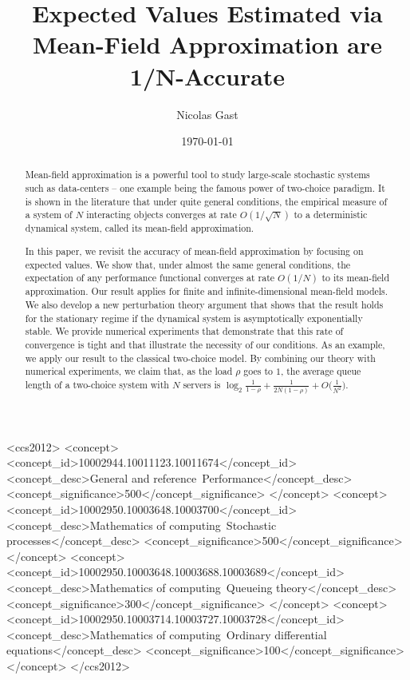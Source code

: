 \documentclass[acmlarge]{acmart}
\title{Expected Values Estimated via Mean-Field Approximation are
  1/N-Accurate}
\author{Nicolas Gast}
\affiliation{%
  \institution{Inria}%
  \streetaddress{Univ. Grenoble Alpes, CNRS, LIG}%
  \city{ Grenoble} %
  \state{France} %
  \postcode{F-38000}%
}%
\date{\today}
\begin{document}
\begin{abstract}
  Mean-field approximation is a powerful tool to study large-scale
  stochastic systems such as data-centers -- one example being the
  famous power of two-choice paradigm.  It is shown in the literature
  that under quite general conditions, the empirical measure of a
  system of $N$ interacting objects converges at rate $O(1/\sqrt{N})$
  to a deterministic dynamical system, called its mean-field
  approximation.

  In this paper, we revisit the accuracy of mean-field approximation
  by focusing on expected values.  We show that, under almost the same
  general conditions, the expectation of any performance functional
  converges at rate $O(1/N)$ to its mean-field approximation.  Our
  result applies for finite and infinite-dimensional mean-field
  models. We also develop a new perturbation theory argument that
  shows that the result holds for the stationary regime if the
  dynamical system is asymptotically exponentially stable.  We provide
  numerical experiments that demonstrate that this rate of convergence
  is tight and that illustrate the necessity of our conditions.  As an
  example, we apply our result to the classical two-choice model. By
  combining our theory with numerical experiments, we claim that, as
  the load $\rho$ goes to $1$, the average queue length of a
  two-choice system with $N$ servers is
  $\log_2\frac1{1-\rho} + \frac1{2N(1-\rho)}
  +O\big(\frac1{N^2}\big)$.
\end{abstract}

\begin{CCSXML}
<ccs2012>
<concept>
<concept_id>10002944.10011123.10011674</concept_id>
<concept_desc>General and reference~Performance</concept_desc>
<concept_significance>500</concept_significance>
</concept>
<concept>
<concept_id>10002950.10003648.10003700</concept_id>
<concept_desc>Mathematics of computing~Stochastic processes</concept_desc>
<concept_significance>500</concept_significance>
</concept>
<concept>
<concept_id>10002950.10003648.10003688.10003689</concept_id>
<concept_desc>Mathematics of computing~Queueing theory</concept_desc>
<concept_significance>300</concept_significance>
</concept>
<concept>
<concept_id>10002950.10003714.10003727.10003728</concept_id>
<concept_desc>Mathematics of computing~Ordinary differential equations</concept_desc>
<concept_significance>100</concept_significance>
</concept>
</ccs2012>
\end{CCSXML}

\end{document}
